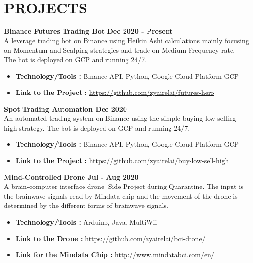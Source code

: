 \section{PROJECTS}

\textbf{Binance Futures Trading Bot \hfill Dec 2020 - Present} \vspace{0.1cm} \\
    A leverage trading bot on Binance using Heikin Ashi calculations mainly focusing on Momentum and Scalping strategies and trade on Medium-Frequency rate. \vspace{0.1cm} \\
    The bot is deployed on GCP and running 24/7. \vspace{0.2cm}
    \begin{itemize}
        \item \textbf{Technology/Tools :} Binance API, Python, Google Cloud Platform GCP
        \item \textbf{Link to the Project :} \url{https://github.com/zyairelai/futures-hero}
    \end{itemize}

\textbf{Spot Trading Automation \hfill Dec 2020} \vspace{0.1cm} \\
    An automated trading system on Binance using the simple buying low selling high strategy. The bot is deployed on GCP and running 24/7. \vspace{0.2cm}
    \begin{itemize}
        \item \textbf{Technology/Tools :} Binance API, Python, Google Cloud Platform GCP
        \item \textbf{Link to the Project :} \url{https://github.com/zyairelai/buy-low-sell-high}
    \end{itemize}

\textbf{Mind-Controlled Drone \hfill Jul - Aug 2020} \vspace{0.1cm} \\
    A brain-computer interface drone. Side Project during Quarantine. The input is the brainwave signals read by Mindata chip and the movement of the drone is determined by the different forms of brainwave signals. \vspace{0.2cm}
    \begin{itemize}
        \item \textbf{Technology/Tools :} Arduino, Java, MultiWii
        \item \textbf{Link to the Drone :} \url{https://github.com/zyairelai/bci-drone/}
        \item \textbf{Link for the Mindata Chip :} \url{http://www.mindatabci.com/en/}
    \end{itemize}


